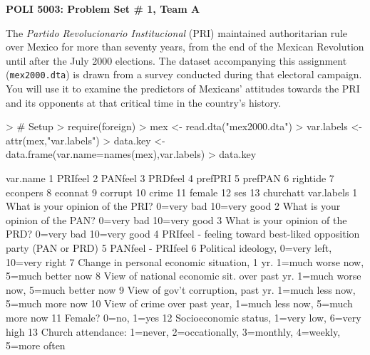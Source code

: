 \documentclass[12pt]{article}
\begin{document}


\pagestyle{empty}

\begin{center}
{\Large \textbf{POLI 5003: Problem Set \# 1, Team A}}
\end{center}

The \emph{Partido Revolucionario Institucional} (PRI) maintained authoritarian rule over Mexico for more than seventy years, from the end of the Mexican Revolution until after the July 2000 elections.  The dataset accompanying this assignment (\texttt{mex2000.dta}) is drawn from a survey conducted during that electoral campaign.  You will use it to examine the predictors of Mexicans' attitudes towards the PRI and its opponents at that critical time in the country's history. 

\begin{Schunk}
\begin{Sinput}
> # Setup
> require(foreign)
> mex <- read.dta("mex2000.dta")
> var.labels <- attr(mex,"var.labels")
> data.key <- data.frame(var.name=names(mex),var.labels)
> data.key
\end{Sinput}
\begin{Soutput}
    var.name
1    PRIfeel
2    PANfeel
3    PRDfeel
4    prefPRI
5    prefPAN
6   rightide
7   econpers
8    econnat
9    corrupt
10     crime
11    female
12       ses
13 churchatt
                                                                         var.labels
1                          What is your opinion of the PRI? 0=very bad 10=very good
2                          What is your opinion of the PAN? 0=very bad 10=very good
3                          What is your opinion of the PRD? 0=very bad 10=very good
4                 PRIfeel - feeling toward best-liked opposition party (PAN or PRD)
5                                                                 PANfeel - PRIfeel
6                                    Political ideology, 0=very left, 10=very right
7  Change in personal economic situation, 1 yr. 1=much worse now, 5=much better now
8  View of national economic sit. over past yr. 1=much worse now, 5=much better now
9               View of gov't corruption, past yr. 1=much less now, 5=much more now
10                   View of crime over past year, 1=much less now, 5=much more now
11                                                              Female? 0=no, 1=yes
12                                    Socioeconomic status, 1=very low, 6=very high
13    Church attendance: 1=never, 2=occationally, 3=monthly, 4=weekly, 5=more often
\end{Soutput}
\end{Schunk}
\end{document}
